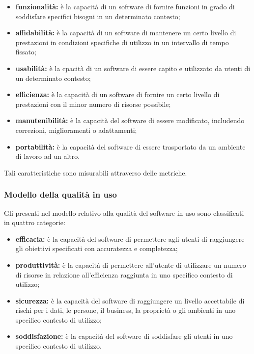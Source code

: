 \documentclass[PianoDiQualifica.tex]{subfiles}
\begin{document}
\begin{itemize}
\item \textbf{funzionalità:} è la capacità di un software di fornire funzioni in grado di soddisfare specifici bisogni in un determinato contesto;
\item \textbf{affidabilità:} è la capacità di un software di mantenere un certo livello di prestazioni in condizioni specifiche di utilizzo in un intervallo di tempo fissato;
\item \textbf{usabilità:} è la cpacità di un software di essere capito e utilizzato da utenti di un determinato contesto;
\item \textbf{efficienza:} è la capacità di un software di fornire un certo livello di prestazioni con il minor numero di risorse possibile;
\item \textbf{manutenibilità:} è la capacità del software di essere modificato, includendo correzioni, miglioramenti o adattamenti;
\item \textbf{portabilità:} è la capacità del software di essere trasportato da un ambiente di lavoro ad un altro.
\end{itemize}

Tali caratteristiche sono misurabili attraverso delle metriche.

\subsubsection{Modello della qualità in uso}
Gli  presenti nel modello relativo alla qualità del software in uso
sono classificati in quattro categorie:

\begin{itemize}
\item \textbf{efficacia:} è la capacità del software di permettere agli utenti di raggiungere gli obiettivi specificati con accuratezza e completezza;
\item \textbf{produttività:} è la capacità di permettere all’utente di utilizzare un numero di risorse in relazione all’efficienza raggiunta in uno specifico contesto di utilizzo;
\item \textbf{sicurezza:} è la capacità del software di raggiungere un livello accettabile di rischi  per i dati, le persone, il business, la proprietà o gli ambienti in uno specifico contesto di utilizzo;
\item \textbf{soddisfazione:} è la capacità del software di soddisfare gli utenti in uno specifico contesto di utilizzo.
\end{itemize}
\end{document}
